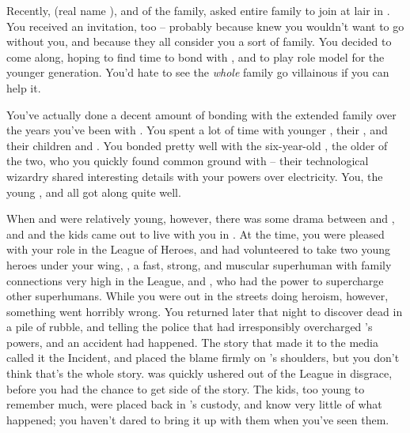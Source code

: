 \documentclass[char]{LRSguildcamp1}
\begin{document}
Recently, \cGrandma{\MYsupername} (real name \cGrandma{\intro}), \cGrandma{\villain} and \cGrandma{\familyleader} of the \cGrandma{\formal} family, asked \cGrandma{\their} entire family to join \cGrandma{\them} at \cGrandma{\their} lair in \pCityGrandma{}.  You received an invitation, too -- probably because \cGrandma{\they} knew you wouldn't want \cGrad{} to go without you, and because they all consider you a sort of family.  You decided to come along, hoping to find time to bond with \cGrad{}, and to play role model for the younger generation.  You'd hate to see the \emph{whole} family go villainous if you can help it.

You've actually done a decent amount of bonding with the extended family over the years you've been with \cOldest{}.  You spent a lot of time with \cOldest{\their} younger \cArchitect{\sibling} \cArchitect{\intro}, their \cAS{\spouse} \cAS{\intro}, and their children \cTeen{} and \cTween{}. You bonded pretty well with the six-year-old \cTeen{}, the older of the two, who you quickly found common ground with -- their technological wizardry shared interesting details with your powers over electricity.  You, the young \cTeen{}, and \cAS{} all got along quite well.

When \cTeen{} and \cTween{} were relatively young, however, there was some drama between \cArchitect{} and \cAS{}, and \cAS{} and the kids came out to live with you in \pCityO{}.  At the time, you were pleased with your role in the League of Heroes, and had volunteered to take two young heroes under your wing, \cJuggernaut{}, a fast, strong, and muscular superhuman with family connections very high in the League, and \cYS{\MYsupername}, who had the power to supercharge other superhumans.  While you were out in the streets doing heroism, however, something went horribly wrong.  You returned later that night to discover \cAS{} dead in a pile of rubble, and \cJuggernaut{} telling the police that \cYS{} had irresponsibly overcharged \cJuggernaut{}'s powers, and an accident had happened.  The story that made it to the media called it the \pCityO{} Incident, and placed the blame firmly on \cYS{\MYsupername}'s shoulders, but you don't think that's the whole story.  \cYS{} was quickly ushered out of the League in disgrace, before you had the chance to get \cYS{\their} side of the story.  The kids, too young to remember much, were placed back in \cArchitect{}'s custody, and know very little of what happened; you haven't dared to bring it up with them when you've seen them.
\end{document}

